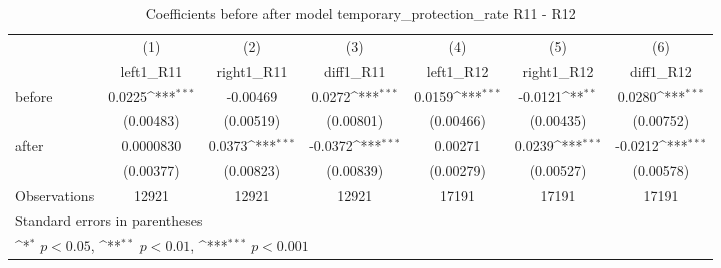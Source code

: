 \begin{table}[htbp]\centering
\def\sym#1{\ifmmode^{#1}\else\(^{#1}\)\fi}
\caption{Coefficients before after model temporary\_protection\_rate R11 - R12}
\begin{tabular}{l*{6}{c}}
\hline\hline
                    &\multicolumn{1}{c}{(1)}&\multicolumn{1}{c}{(2)}&\multicolumn{1}{c}{(3)}&\multicolumn{1}{c}{(4)}&\multicolumn{1}{c}{(5)}&\multicolumn{1}{c}{(6)}\\
                    &\multicolumn{1}{c}{left1\_R11}&\multicolumn{1}{c}{right1\_R11}&\multicolumn{1}{c}{diff1\_R11}&\multicolumn{1}{c}{left1\_R12}&\multicolumn{1}{c}{right1\_R12}&\multicolumn{1}{c}{diff1\_R12}\\
\hline
before              &      0.0225\sym{***}&    -0.00469         &      0.0272\sym{***}&      0.0159\sym{***}&     -0.0121\sym{**} &      0.0280\sym{***}\\
                    &   (0.00483)         &   (0.00519)         &   (0.00801)         &   (0.00466)         &   (0.00435)         &   (0.00752)         \\
[1em]
after               &   0.0000830         &      0.0373\sym{***}&     -0.0372\sym{***}&     0.00271         &      0.0239\sym{***}&     -0.0212\sym{***}\\
                    &   (0.00377)         &   (0.00823)         &   (0.00839)         &   (0.00279)         &   (0.00527)         &   (0.00578)         \\
\hline
Observations        &       12921         &       12921         &       12921         &       17191         &       17191         &       17191         \\
\hline\hline
\multicolumn{7}{l}{\footnotesize Standard errors in parentheses}\\
\multicolumn{7}{l}{\footnotesize \sym{*} \(p<0.05\), \sym{**} \(p<0.01\), \sym{***} \(p<0.001\)}\\
\end{tabular}
\end{table}
